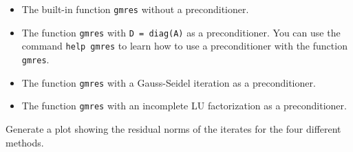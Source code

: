 \documentclass[10pt]{report}
\begin{document}
\begin{enumerate}
\begin{itemize}
\item The built-in function \verb+gmres+ without a preconditioner.

\item The function \verb+gmres+ with \verb+D = diag(A)+ as a  preconditioner. You can use the command \verb+help gmres+ to learn how to use a preconditioner with the function \verb+gmres+.

\item The function \verb+gmres+ with a Gauss-Seidel iteration as a preconditioner.

\item The function \verb+gmres+ with an incomplete LU factorization as a preconditioner.
\end{itemize} 

Generate a plot showing the residual norms of the iterates for the four different methods.
\end{enumerate}
\end{document}
